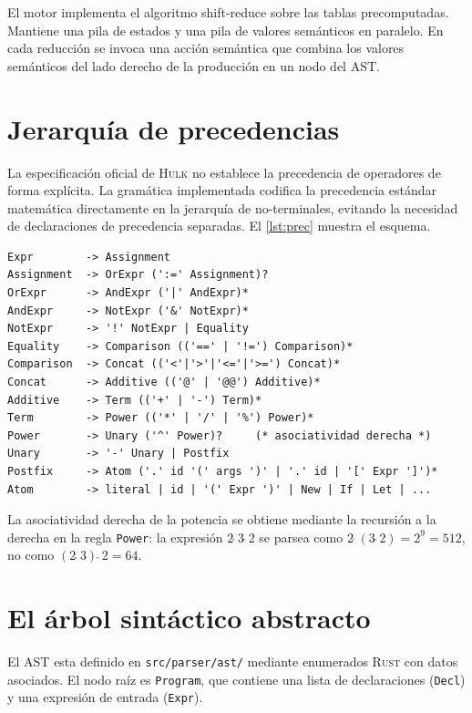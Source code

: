 \documentclass[11pt,a4paper,oneside,openany]{report}
\newcommand{\hulk}{\textsc{Hulk}}
\newcommand{\code}[1]{\texttt{#1}}
\newcommand{\rust}{\textsc{Rust}}
\begin{document}
El motor implementa el algoritmo shift-reduce sobre las tablas precomputadas.
Mantiene una pila de estados y una pila de valores semánticos en paralelo. En cada
reducción se invoca una acción semántica que combina los valores semánticos del
lado derecho de la producción en un nodo del AST.

\section{Jerarquía de precedencias}

La especificación oficial de \hulk{} no establece la precedencia de operadores de
forma explícita. La gramática implementada codifica la precedencia estándar
matemática directamente en la jerarquía de no-terminales, evitando la necesidad de
declaraciones de precedencia separadas. El \cref{lst:prec} muestra el esquema.

\begin{lstlisting}[style=bnf, caption={Codificación de precedencias en la gramática.},
  label={lst:prec}]
Expr        -> Assignment
Assignment  -> OrExpr (':=' Assignment)?
OrExpr      -> AndExpr ('|' AndExpr)*
AndExpr     -> NotExpr ('&' NotExpr)*
NotExpr     -> '!' NotExpr | Equality
Equality    -> Comparison (('==' | '!=') Comparison)*
Comparison  -> Concat (('<'|'>'|'<='|'>=') Concat)*
Concat      -> Additive (('@' | '@@') Additive)*
Additive    -> Term (('+' | '-') Term)*
Term        -> Power (('*' | '/' | '%') Power)*
Power       -> Unary ('^' Power)?     (* asociatividad derecha *)
Unary       -> '-' Unary | Postfix
Postfix     -> Atom ('.' id '(' args ')' | '.' id | '[' Expr ']')*
Atom        -> literal | id | '(' Expr ')' | New | If | Let | ...
\end{lstlisting}

La asociatividad derecha de la potencia se obtiene mediante la recursión a la
derecha en la regla \code{Power}: la expresión $2 \,\widehat{}\, 3 \,\widehat{}\, 2$
se parsea como $2 \,\widehat{}\, (3 \,\widehat{}\, 2) = 2^9 = 512$, no como
$(2 \,\widehat{}\, 3) \,\widehat{}\, 2 = 64$.

\section{El árbol sintáctico abstracto}

El AST esta definido en \code{src/parser/ast/} mediante enumerados \rust{} con datos
asociados. El nodo raíz es \code{Program}, que contiene una lista de declaraciones
(\code{Decl}) y una expresión de entrada (\code{Expr}).
\end{document}
